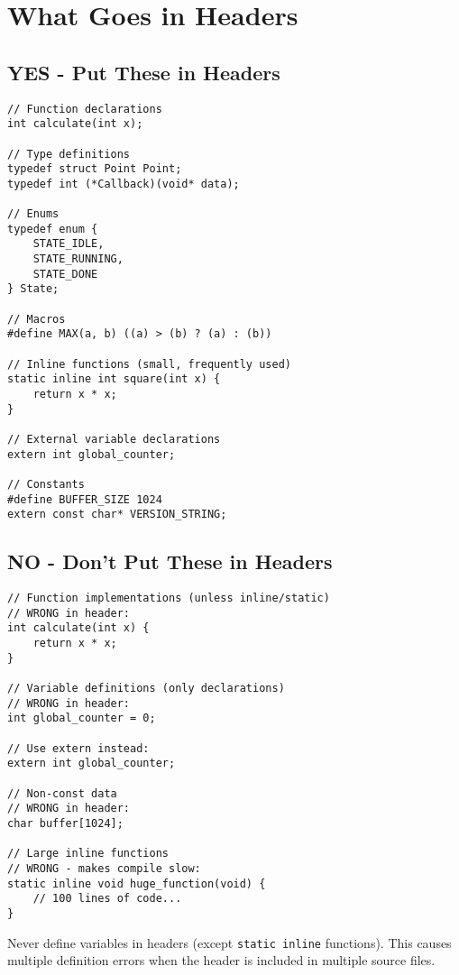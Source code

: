 \section{What Goes in Headers}

\subsection{YES - Put These in Headers}

\begin{lstlisting}
// Function declarations
int calculate(int x);

// Type definitions
typedef struct Point Point;
typedef int (*Callback)(void* data);

// Enums
typedef enum {
    STATE_IDLE,
    STATE_RUNNING,
    STATE_DONE
} State;

// Macros
#define MAX(a, b) ((a) > (b) ? (a) : (b))

// Inline functions (small, frequently used)
static inline int square(int x) {
    return x * x;
}

// External variable declarations
extern int global_counter;

// Constants
#define BUFFER_SIZE 1024
extern const char* VERSION_STRING;
\end{lstlisting}

\subsection{NO - Don't Put These in Headers}

\begin{lstlisting}
// Function implementations (unless inline/static)
// WRONG in header:
int calculate(int x) {
    return x * x;
}

// Variable definitions (only declarations)
// WRONG in header:
int global_counter = 0;

// Use extern instead:
extern int global_counter;

// Non-const data
// WRONG in header:
char buffer[1024];

// Large inline functions
// WRONG - makes compile slow:
static inline void huge_function(void) {
    // 100 lines of code...
}
\end{lstlisting}

\begin{warningbox}
Never define variables in headers (except \texttt{static inline} functions). This causes multiple definition errors when the header is included in multiple source files.
\end{warningbox}

